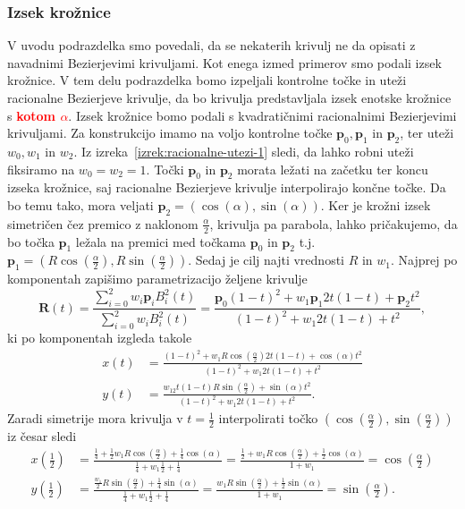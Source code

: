 \documentclass[isrm2, tisk]{fmfdelo}
\newcommand{\p}{\textbf{p}}
\newcommand{\mycomment}[1]{\textbf{\textcolor{red}{#1}}}
\begin{document}
    \subsubsection{Izsek krožnice}
    V uvodu podrazdelka smo povedali, da se nekaterih krivulj ne da opisati z navadnimi Bezierjevimi krivuljami.
    Kot enega izmed primerov smo podali izsek krožnice.
    V tem delu podrazdelka bomo izpeljali kontrolne točke in uteži racionalne Bezierjeve krivulje, da bo krivulja predstavljala izsek enotske krožnice s \mycomment{kotom $\alpha$}.
    Izsek krožnice bomo podali s kvadratičnimi racionalnimi Bezierjevimi krivuljami.
    Za konstrukcijo imamo na voljo kontrolne točke $\p_0,\p_1$ in $\p_2$, ter uteži $w_0,w_1$ in $w_2$.
    Iz izreka~\ref{izrek:racionalne-utezi-1} sledi, da lahko robni uteži fiksiramo na $w_0=w_2=1$.
    Točki $\p_0$ in $\p_2$ morata ležati na začetku ter koncu izseka krožnice, saj racionalne Bezierjeve krivulje interpolirajo končne točke.
    Da bo temu tako, mora veljati $\p_2=(\cos(\alpha),\sin(\alpha))$.
    Ker je krožni izsek simetričen čez premico z naklonom $\frac{\alpha}{2}$, krivulja pa parabola, lahko pričakujemo, da bo točka $\p_1$ ležala na premici med točkama $\p_0$ in $\p_2$ t.j.\ $\p_1=\left(R\cos\left(\frac{\alpha}{2}\right),R\sin\left(\frac{\alpha}{2}\right)\right)$.
    Sedaj je cilj najti vrednosti $R$ in $w_1$.
    Najprej po komponentah zapišimo parametrizacijo željene krivulje
    \[\mathbf{R}(t) = \frac{\sum^{2}_{i=0}w_i\p_i B^2_i(t)}{\sum^{2}_{i=0}w_i B^2_i(t)} = \frac{\p_0 (1-t)^2 + w_1\p_1 2t(1-t) + \p_2 t^2}{(1-t)^2 + w_1 2t(1-t) + t^2},\]
    ki po komponentah izgleda takole
    \begin{align*}
        x(t) &= \frac{(1-t)^2 + w_1R\cos\left(\frac{\alpha}{2}\right) 2t(1-t) + \cos(\alpha)t^2}{(1-t)^2 + w_1 2t(1-t) + t^2} \\
        y(t) &= \frac{w_12t(1-t)R\sin\left(\frac{\alpha}{2}\right) + \sin(\alpha)t^2}{(1-t)^2 + w_1 2t(1-t) + t^2}.
    \end{align*}
    Zaradi simetrije mora krivulja v $t=\frac{1}{2}$ interpolirati točko $\left(\cos\left(\frac{\alpha}{2}\right),\sin\left(\frac{\alpha}{2}\right)\right)$ iz česar sledi
    \begin{align*}
        x\left(\frac{1}{2}\right) &= \frac{\frac{1}{4} +  \frac{1}{2}w_1R\cos\left(\frac{\alpha}{2}\right) + \frac{1}{4}\cos(\alpha)}{\frac{1}{4}+ w_1\frac{1}{2} + \frac{1}{4}} = \frac{ \frac{1}{2} + w_1R\cos\left(\frac{\alpha}{2}\right) + \frac{1}{2}\cos(\alpha)}{1+w_1} = \cos\left(\frac{\alpha}{2}\right) \\
        y\left(\frac{1}{2}\right) &= \frac{\frac{w_1}{2}R\sin\left(\frac{\alpha}{2}\right) + \frac{1}{4}\sin(\alpha)}{\frac{1}{4}+ w_1\frac{1}{2} + \frac{1}{4}} =  \frac{w_1R\sin\left(\frac{\alpha}{2}\right) + \frac{1}{2}\sin(\alpha)}{1+w_1} = \sin\left(\frac{\alpha}{2}\right).
    \end{align*}
\end{document}

